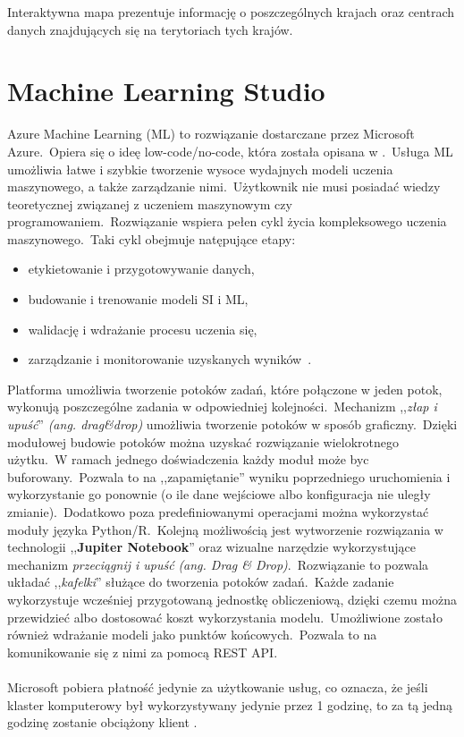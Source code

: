 Interaktywna mapa prezentuje informację o poszczególnych krajach oraz centrach danych znajdujących się na terytoriach tych krajów.

\section{Machine Learning Studio}
Azure Machine Learning (ML) to rozwiązanie dostarczane przez Microsoft Azure.\ Opiera się o ideę low-code/no-code, która została opisana w .\ Usługa ML umożliwia łatwe i szybkie tworzenie wysoce wydajnych modeli uczenia maszynowego, a także zarządzanie nimi.\ Użytkownik nie musi posiadać wiedzy teoretycznej związanej z uczeniem maszynowym czy programowaniem.\ Rozwiązanie wspiera pełen cykl życia kompleksowego uczenia maszynowego.\ Taki cykl obejmuje natępujące etapy:
\begin{itemize}
    \item etykietowanie i przygotowywanie danych,
    \item budowanie i trenowanie modeli SI i ML,
    \item walidację i wdrażanie procesu uczenia się,
    \item zarządzanie i monitorowanie uzyskanych wyników~\cite{MicrosoftAzurel}.
\end{itemize}


Platforma umożliwia tworzenie potoków zadań, które połączone w jeden potok, wykonują poszczególne zadania w odpowiedniej kolejności.\ Mechanizm ,,\textit{złap i upuść}'' \textit{(ang. drag\&drop)} umożliwia tworzenie potoków w sposób graficzny.\ Dzięki modułowej budowie potoków można uzyskać rozwiązanie wielokrotnego użytku.\ W ramach jednego doświadczenia każdy moduł może byc buforowany.\ Pozwala to na ,,zapamiętanie'' wyniku poprzedniego uruchomienia i wykorzystanie go ponownie (o ile dane wejściowe albo konfiguracja nie uległy zmianie).\ Dodatkowo poza predefiniowanymi operacjami można wykorzystać moduły języka Python/R.\ Kolejną możliwością jest wytworzenie rozwiązania w technologii ,,\textbf{Jupiter Notebook}'' oraz wizualne narzędzie wykorzystujące mechanizm \textit{przeciągnij i upuść} \textit{(ang. Drag \& Drop)}.\ Rozwiązanie to pozwala układać ,,\textit{kafelki}'' służące do tworzenia potoków zadań.\ Każde zadanie wykorzystuje wcześniej przygotowaną jednostkę obliczeniową, dzięki czemu można przewidzieć albo dostosować koszt wykorzystania modelu.\ Umożliwione zostało również wdrażanie modeli jako punktów końcowych.\ Pozwala to na komunikowanie się z nimi za pomocą REST API.
\\ \\
Microsoft pobiera płatność jedynie za użytkowanie usług, co oznacza, że jeśli klaster komputerowy był wykorzystywany jedynie przez 1 godzinę, to za tą jedną godzinę zostanie obciążony klient \cite{MicrosoftAzuref}.